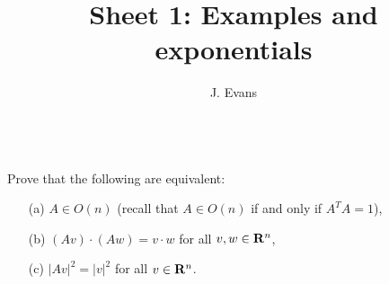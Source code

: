 \documentclass[12pt]{article}
\title{Sheet 1: Examples and exponentials}
\author{J. Evans}
\date{}
\begin{document}
\maketitle

\bigskip

\begin{question}\ \\
Prove that the following are equivalent:
\begin{enumerate}
\item[(a)] $A\in O(n)$ (recall that $A\in O(n)$ if and only if $A^TA=1$),
\item[(b)] $(Av)\cdot (Aw)=v\cdot w$ for all $v,w\in\mathbf{R}^n$,
\item[(c)] $|Av|^2=|v|^2$ for all $v\in\mathbf{R}^n$.
\end{enumerate}
\end{question}

\iffalse
\begin{answer}
(c) is obvious given (b): just take $v=w$. To show (b) from (c), take $u=v+w$ and note that
\[|v|^2+|w|^2+2v\cdot w=|u|^2=|Au|^2=|Av|^2+|Aw|^2+2(Av)\cdot(Aw)\]
which implies (b) since we are in characteristic $0\neq 2$.

Suppose that $A\in O(n)$. Then $A^TA=1$ so
\[(Av)\cdot(Aw)=v^TA^TAw=v^Tw=v\cdot w.\]
Conversely, (b) holds then $v^TA^TAw=v^Tw$. If we let $v$ and $w$ run independently over an orthonormal basis $\{e_i\}$ then $e_i^TA^TAe_j=(A^TA)_{ij}=e_i^Te_j=\delta_{ij}$, so $A^TA=1$.

Out of interest, here are two ways of going straight from (c) to (a):
\begin{itemize}
\item If $v=\sum_ix_ie_i$ then $|v|^2=\sum_ix_i^2$ and $|Av|^2=\sum_{j,k}\sum_iA_{ij}A_{ik}x_jx_k$. Thinking of these as polynomials in the $x_n$ and comparing coefficients we get $A_{ij}A_{ik}=\delta_{ij}$ so $A^TA=1$.
\item $v^Tv=|v|^2=|Av|^2=v^TA^TAv$ so $v^T(A^TA-1)v=0$. $A^TA-1$ is symmetric and hence can be diagonalised in some orthonormal basis $e_i$. With respect to this basis, $e_i(A^TA-1)e_i=(A^TA-1)_{ii}=0$ so the diagonal entries are all zero. Since this matrix is in diagonal form, it must vanish. Hence $A^TA=1$.
\end{itemize}
\end{answer}
\newpage
\fi

\bigskip
\end{document}
